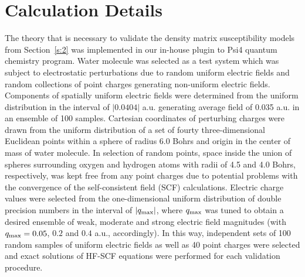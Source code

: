 \documentclass[aip,amsmath,amssymb,reprint,floatfix]{revtex4-1}
\begin{document}
\section{\label{s:3}Calculation Details}

The theory that is necessary to validate the density matrix susceptibility models from Section~\ref{s:2}
was implemented in our in\hyp{}house plugin to {\sc Psi4} quantum chemistry program.\cite{Psi4.JCTC.2017}
Water molecule
was selected as a test system which was subject to 
electrostatic perturbations due to random uniform electric fields and random collections of point charges
generating non\hyp{}uniform electric fields. 
Components of spatially uniform electric fields were determined 
from the uniform distribution in the interval of $\vert 0.0404 \vert$ a.u.
generating average field of 0.035 a.u. in an ensemble of 100 samples.
Cartesian coordinates of perturbing charges were drawn from the uniform distribution 
of a set of fourty three\hyp{}dimensional Euclidean points within a sphere of radius 6.0 Bohrs
and origin in the center of mass of water molecule.
In selection of random points, space inside the union of spheres surrounding
oxygen and hydrogen atoms with radii of 4.5 and 4.0 Bohrs, respectively, was
kept free from any point charges due to potential problems with the convergence of the 
self\hyp{}consistent field (SCF) calculations.
Electric charge values were selected from the one\hyp{}dimensional uniform distribution
of double precision numbers in the interval of $\vert q_{\rm max} \vert$, where $q_{\rm max}$
was tuned to obtain a desired ensemble of weak, moderate and strong electric field magnitudes
(with $q_{\rm max}=0.05$, $0.2$ and $0.4$ a.u., accordingly).
In this way, independent sets of 100 random samples of uniform electric fields as well as 
40 point charges were selected and exact solutions of HF\hyp{}SCF equations were 
performed for each validation procedure.
\end{document}
